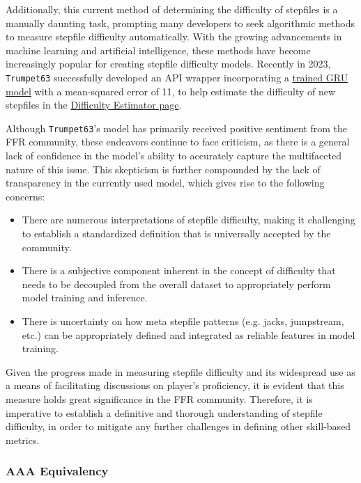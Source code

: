 Additionally, this current method of determining the difficulty of stepfiles is a manually daunting task, prompting many developers to seek algorithmic methods to measure stepfile difficulty automatically. With the growing advancements in machine learning and artificial intelligence, these methods have become increasingly popular for creating stepfile difficulty models. Recently in 2023, \texttt{Trumpet63} successfully developed an API wrapper incorporating a \href{https://www.flashflashrevolution.com/vbz/showthread.php?t=154255}{trained GRU model} with a mean-squared error of 11, to help estimate the difficulty of new stepfiles in the \href{https://www.flashflashrevolution.com/~velocity/ffrjs/difficulty/}{Difficulty Estimator page}.

\vspace{2mm}

Although \texttt{Trumpet63}’s model has primarily received positive sentiment from the FFR community, these endeavors continue to face criticism, as there is a general lack of confidence in the model’s ability to accurately capture the multifaceted nature of this issue. This skepticism is further compounded by the lack of transparency in the currently used model, which gives rise to the following concerns:

\begin{itemize}
	\item There are numerous interpretations of stepfile difficulty, making it challenging to establish a standardized definition that is universally accepted by the community.
	\item There is a subjective component inherent in the concept of difficulty that needs to be decoupled from the overall dataset to appropriately perform model training and inference.
	\item There is uncertainty on how meta stepfile patterns (e.g. jacks, jumpstream, etc.) can be appropriately defined and integrated as reliable features in model training. 
\end{itemize}

Given the progress made in measuring stepfile difficulty and its widespread use as a means of facilitating discussions on player's proficiency, it is evident that this measure holds great significance in the FFR community. Therefore, it is imperative to establish a definitive and thorough understanding of stepfile difficulty, in order to mitigate any further challenges in defining other skill-based metrics.

\subsubsection{AAA Equivalency}

